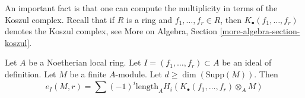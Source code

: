 \noindent
An important fact is that one can compute the multiplicity in terms
of the Koszul complex. Recall that if $R$ is a ring and
$f_1, \ldots, f_r \in R$, then $K_\bullet(f_1, \ldots, f_r)$
denotes the Koszul complex, see
More on Algebra, Section \ref{more-algebra-section-koszul}.

\begin{theorem}
\label{theorem-multiplicity-with-koszul}
\begin{reference}
\cite[Theorem 1 in part B of Chapter IV]{Serre_algebre_locale}
\end{reference}
Let $A$ be a Noetherian local ring. Let $I = (f_1, \ldots, f_r) \subset A$
be an ideal of definition. Let $M$ be a finite $A$-module. Let
$d \geq \dim(\text{Supp}(M))$. Then
$$
e_I(M, r) = \sum
(-1)^i\text{length}_A H_i(K_\bullet(f_1, \ldots, f_r) \otimes_A M)
$$
\end{theorem}

